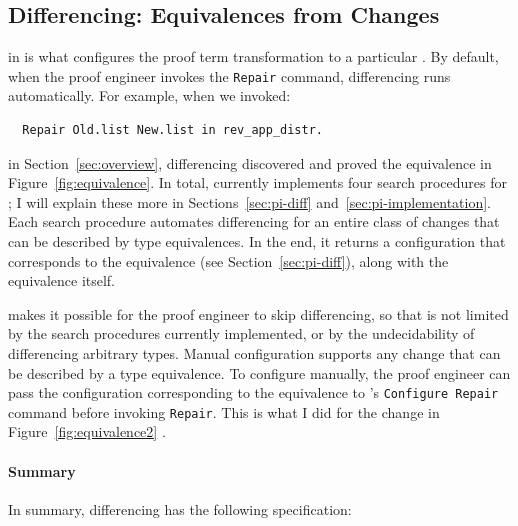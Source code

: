 \subsection{Differencing: Equivalences from Changes}
\label{sec:pi-spec-diff}

 in \toolnamec is what configures the proof term transformation to a particular .
By default, when the proof engineer invokes the \lstinline{Repair} command, differencing runs automatically.
For example, when we invoked:

\begin{lstlisting}
  Repair Old.list New.list in rev_app_distr.
\end{lstlisting}
in Section~\ref{sec:overview}, differencing discovered and proved the equivalence in Figure~\ref{fig:equivalence}.
In total, \toolnamec currently implements four search procedures for ;
I will explain these more in Sections~\ref{sec:pi-diff} and~\ref{sec:pi-implementation}.
Each search procedure automates differencing for an entire class of changes that can be described by type equivalences. 
In the end, it returns a configuration that corresponds to the equivalence (see Section~\ref{sec:pi-diff}),
along with the equivalence itself.

 makes it possible for the proof engineer to skip differencing, so that \toolnamec is not limited by the 
search procedures currently implemented, or by the undecidability of differencing arbitrary types.
Manual configuration supports any change that can be described by a type equivalence.
To configure \toolnamec manually, the proof engineer can pass the configuration corresponding to the equivalence to \toolnamec's \lstinline{Configure Repair} command before invoking \lstinline{Repair}.
This is what I did for the change in Figure~\ref{fig:equivalence2} \href{https://github.com/uwplse/pumpkin-pi/blob/v2.0.0/plugin/coq/playground/constr_refactor.v}{}.

\paragraph{Summary}

In summary, differencing has the following specification:

